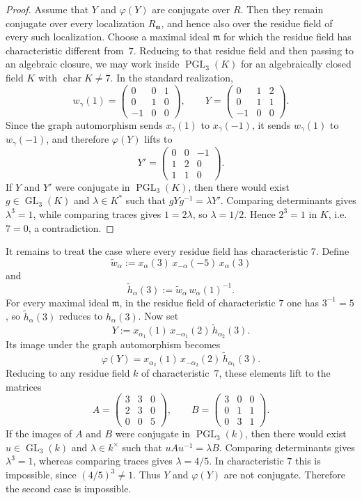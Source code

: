 \documentclass[]{jgcc}
\DeclareMathOperator{\charr}{char}
\DeclareMathOperator{\GL}{GL}
\DeclareMathOperator{\PGL}{PGL}
\numberwithin{equation}{section}
\begin{document}
\begin{proof}
Assume that $Y$ and $\varphi(Y)$ are conjugate over $R$.
Then they remain conjugate over every localization $R_{\mathfrak m}$, and hence also over the residue field of every such localization.
Choose a maximal ideal $\mathfrak m$ for which the residue field has characteristic different from~$7$.
Reducing to that residue field and then passing to an algebraic closure, we may work inside $\PGL_3(K)$ for an algebraically closed field $K$ with $\charr K\ne 7$.
In the standard realization,
\[
w_\gamma(1)=
\begin{pmatrix}
0 & 0 & 1\\
0 & 1 & 0\\
-1& 0 & 0
\end{pmatrix},
\qquad
Y=
\begin{pmatrix}
0 & 1 & 2\\
0 & 1 & 1\\
-1& 0 & 0
\end{pmatrix}.
\]
Since the graph automorphism sends $x_\gamma(1)$ to $x_\gamma(-1)$, it sends $w_\gamma(1)$ to $w_\gamma(-1)$, and therefore $\varphi(Y)$ lifts to
\[
Y'=
\begin{pmatrix}
0 & 0 & -1\\
1 & 2 & 0\\
1 & 1 & 0
\end{pmatrix}.
\]
If $Y$ and $Y'$ were conjugate in $\PGL_3(K)$, then there would exist $g\in \GL_3(K)$ and $\lambda\in K^*$ such that $gYg^{-1}=\lambda Y'$.
Comparing determinants gives $\lambda^3=1$, while comparing traces gives $1=2\lambda$, so $\lambda=1/2$.
Hence $2^3=1$ in $K$, i.e. $7=0$, a contradiction.
\end{proof}

It remains to treat the case where every residue field has characteristic $7$.
Define
\[
\widetilde w_\alpha:=x_\alpha(3)\,x_{-\alpha}(-5)\,x_\alpha(3)
\]
and
\[
\widetilde h_\alpha(3):=\widetilde w_\alpha\,w_\alpha(1)^{-1}.
\]
For every maximal ideal $\mathfrak m$, in the residue field of characteristic $7$ one has $3^{-1}=5$, so $\widetilde h_\alpha(3)$ reduces to $h_\alpha(3)$.
Now set
\[
Y:=x_{\alpha_1}(1)\,x_{-\alpha_1}(2)\,\widetilde h_{\alpha_2}(3).
\]
Its image under the graph automorphism becomes
\[
\varphi(Y)=x_{\alpha_2}(1)\,x_{-\alpha_2}(2)\,\widetilde h_{\alpha_1}(3).
\]
Reducing to any residue field $k$ of characteristic~$7$, these elements lift to the matrices
\[
A=
\begin{pmatrix}
3&3&0\\
2&3&0\\
0&0&5
\end{pmatrix},
\qquad
B=
\begin{pmatrix}
3&0&0\\
0&1&1\\
0&3&1
\end{pmatrix}.
\]
If the images of $A$ and $B$ were conjugate in $\PGL_3(k)$, then there would exist $u\in\GL_3(k)$ and $\lambda\in k^\times$ such that $uAu^{-1}=\lambda B$.
Comparing determinants gives $\lambda^3=1$, whereas comparing traces gives $\lambda=4/5$.
In characteristic $7$ this is impossible, since $(4/5)^3\ne 1$.
Thus $Y$ and $\varphi(Y)$ are not conjugate.
Therefore the second case is impossible.
\end{document}
